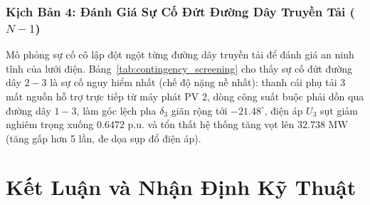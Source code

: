 \documentclass[12pt,a4paper,oneside]{report}
\begin{document}
\subsection{Kịch Bản 4: Đánh Giá Sự Cố Đứt Đường Dây Truyền Tải ($N-1$)}
Mô phỏng sự cố cô lập đột ngột từng đường dây truyền tải để đánh giá an ninh tĩnh của lưới điện. Bảng~\ref{tab:contingency_screening} cho thấy sự cố đứt đường dây $2 - 3$ là sự cố nguy hiểm nhất (chế độ nặng nề nhất): thanh cái phụ tải 3 mất nguồn hỗ trợ trực tiếp từ máy phát PV 2, dòng công suất buộc phải dồn qua đường dây $1 - 3$, làm góc lệch pha $\delta_3$ giãn rộng tới $-21.48^\circ$, điện áp $U_3$ sụt giảm nghiêm trọng xuống $0.6472\text{ p.u.}$ và tổn thất hệ thống tăng vọt lên $32.738\text{ MW}$ (tăng gấp hơn 5 lần, đe dọa sụp đổ điện áp).

\begin{table}[H]
\centering
\caption{Đánh giá an ninh tĩnh khi xảy ra sự cố đứt đường dây truyền tải ($N-1$).}
\label{tab:contingency_screening}
\end{table}

\chapter{Kết Luận và Nhận Định Kỹ Thuật}
\end{document}

